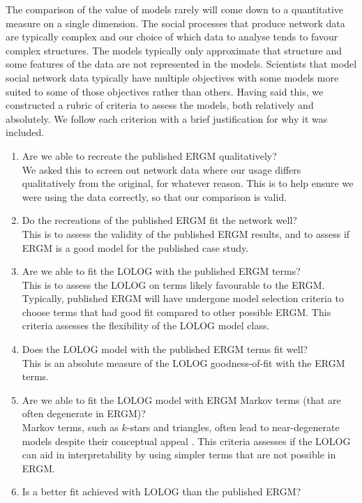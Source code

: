 \documentclass[
]{statsoc}
\begin{document}
The comparison of the value of models rarely will come down to a
quantitative measure on a single dimension. The social processes that
produce network data are typically complex and our choice of which data
to analyse tends to favour complex structures. The models typically only
approximate that structure and some features of the data are not
represented in the models. Scientists that model social network data
typically have multiple objectives with some models more suited to some
of those objectives rather than others. Having said this, we constructed
a rubric of criteria to assess the models, both relatively and
absolutely. We follow each criterion with a brief justification for why
it was included.

\begin{enumerate}
\item Are we able to recreate the published ERGM qualitatively?\\
We asked this to screen out network data where our usage differs qualitatively from the original, for whatever reason. This is to help ensure we were using the data correctly, so that our comparison is valid.
\item Do the recreations of the published ERGM fit the network well?\\
This is to assess the validity of the published ERGM results, and to assess if ERGM is a good model for the published case study.
\item Are we able to fit the LOLOG with the published ERGM terms?\\
This is to assess the LOLOG on terms likely favourable to the ERGM. Typically, published ERGM will have undergone model selection criteria to
choose terms that had good fit compared to other possible ERGM. This criteria assesses the flexibility of the LOLOG model class.
\item Does the LOLOG model with the published ERGM terms fit well?\\
This is an absolute measure of the LOLOG goodness-of-fit with the ERGM terms.
\item Are we able to fit the LOLOG model with ERGM Markov terms (that are often degenerate in ERGM)?\\
Markov terms, such as $k$-stars and triangles, often lead to near-degenerate models despite their conceptual appeal \citep{FrankStrauss1986}. This criteria assesses if the LOLOG can aid in interpretability by using simpler terms that are not possible in ERGM.
\item Is a better fit achieved with LOLOG than the published ERGM?\\

\end{enumerate}
\end{document}
